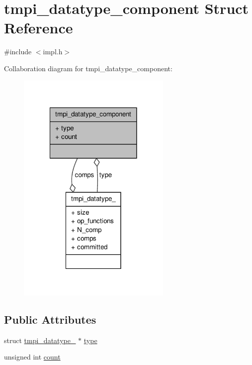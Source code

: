\hypertarget{structtmpi__datatype__component}{\section{tmpi\-\_\-datatype\-\_\-component \-Struct \-Reference}
\label{structtmpi__datatype__component}
}


{\ttfamily \#include $<$impl.\-h$>$}



\-Collaboration diagram for tmpi\-\_\-datatype\-\_\-component\-:
\nopagebreak
\begin{figure}[H]
\begin{center}
\leavevmode
\includegraphics[width=210pt]{structtmpi__datatype__component__coll__graph}
\end{center}
\end{figure}
\subsection*{\-Public \-Attributes}
\begin{DoxyCompactItemize}
\item 
struct \hyperlink{structtmpi__datatype__}{tmpi\-\_\-datatype\-\_\-} $\ast$ \hyperlink{structtmpi__datatype__component_a1787aab608b6116c05d11179a512e8b4}{type}
\item 
unsigned int \hyperlink{structtmpi__datatype__component_a40d703efc84f28175f2747bd8b4e6e4b}{count}
\end{DoxyCompactItemize}



